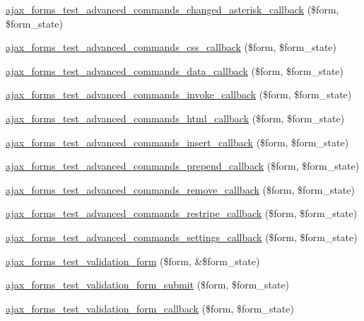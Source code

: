 \begin{DoxyCompactItemize}
\item 
\hyperlink{ajax__forms__test_8module_a9b8db00856dcbcf36820038826bb7e11}{ajax\_\-forms\_\-test\_\-advanced\_\-commands\_\-changed\_\-asterisk\_\-callback} (\$form, \$form\_\-state)
\item 
\hyperlink{ajax__forms__test_8module_a5627328a5ed2e4cf9193e6a3a0cac866}{ajax\_\-forms\_\-test\_\-advanced\_\-commands\_\-css\_\-callback} (\$form, \$form\_\-state)
\item 
\hyperlink{ajax__forms__test_8module_aca2f8b097fc15d62d12142f3a4dba076}{ajax\_\-forms\_\-test\_\-advanced\_\-commands\_\-data\_\-callback} (\$form, \$form\_\-state)
\item 
\hyperlink{ajax__forms__test_8module_ada9eb95fda405cff3e069608a71d27a6}{ajax\_\-forms\_\-test\_\-advanced\_\-commands\_\-invoke\_\-callback} (\$form, \$form\_\-state)
\item 
\hyperlink{ajax__forms__test_8module_a48c117c35404cb006f7e53b768f887dc}{ajax\_\-forms\_\-test\_\-advanced\_\-commands\_\-html\_\-callback} (\$form, \$form\_\-state)
\item 
\hyperlink{ajax__forms__test_8module_ac3073c907ece585adcdf2577eee3c32b}{ajax\_\-forms\_\-test\_\-advanced\_\-commands\_\-insert\_\-callback} (\$form, \$form\_\-state)
\item 
\hyperlink{ajax__forms__test_8module_a9b22249102509c9ceb56c9f0ffa3715c}{ajax\_\-forms\_\-test\_\-advanced\_\-commands\_\-prepend\_\-callback} (\$form, \$form\_\-state)
\item 
\hyperlink{ajax__forms__test_8module_add683faa10d5286709514dedf26e4100}{ajax\_\-forms\_\-test\_\-advanced\_\-commands\_\-remove\_\-callback} (\$form, \$form\_\-state)
\item 
\hyperlink{ajax__forms__test_8module_af2e82f49c8f594b6fb3279ea2e5eec67}{ajax\_\-forms\_\-test\_\-advanced\_\-commands\_\-restripe\_\-callback} (\$form, \$form\_\-state)
\item 
\hyperlink{ajax__forms__test_8module_a40b5124962d966ad45e590274035f01b}{ajax\_\-forms\_\-test\_\-advanced\_\-commands\_\-settings\_\-callback} (\$form, \$form\_\-state)
\item 
\hyperlink{ajax__forms__test_8module_a16f5363fcafca108e7c299f6f463abe2}{ajax\_\-forms\_\-test\_\-validation\_\-form} (\$form, \&\$form\_\-state)
\item 
\hyperlink{ajax__forms__test_8module_a85eb09134f35df5abd02870a263e0f32}{ajax\_\-forms\_\-test\_\-validation\_\-form\_\-submit} (\$form, \$form\_\-state)
\item 
\hyperlink{ajax__forms__test_8module_a0f5790428359ee51c6949f4a93cb5387}{ajax\_\-forms\_\-test\_\-validation\_\-form\_\-callback} (\$form, \$form\_\-state)

\end{DoxyCompactItemize}
